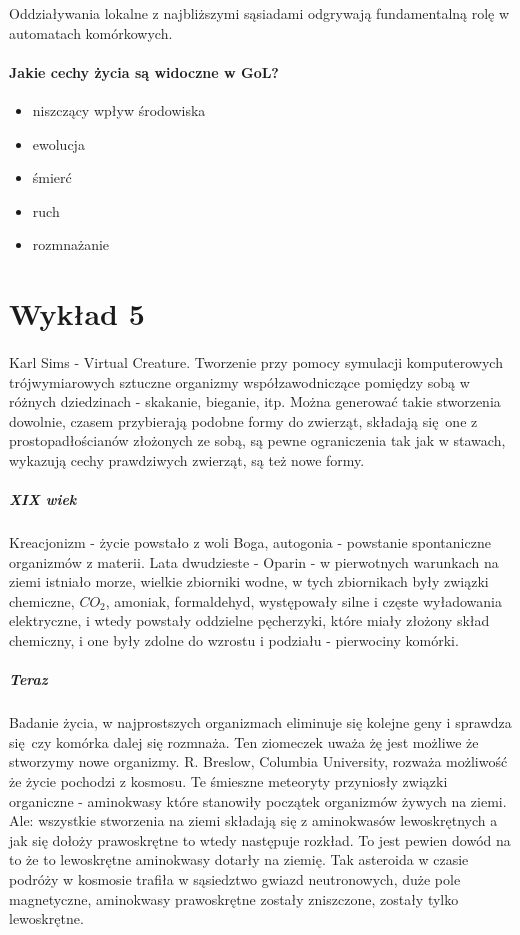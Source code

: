 \documentclass{article}
\begin{document}
		 Oddziaływania lokalne z najbliższymi sąsiadami odgrywają fundamentalną rolę w automatach komórkowych.
		\paragraph{Jakie cechy życia są widoczne w GoL?} 
		 \begin{itemize}
		 	\item niszczący wpływ środowiska
		 	\item ewolucja
		 	\item śmierć
		 	\item ruch
		 	\item rozmnażanie
		 \end{itemize}
	\section{Wykład 5}
		\paragraph{}Karl Sims - Virtual Creature. Tworzenie przy pomocy symulacji komputerowych trójwymiarowych sztuczne organizmy współzawodniczące pomiędzy sobą w różnych dziedzinach - skakanie, bieganie, itp. 
		Można generować takie stworzenia dowolnie, czasem przybierają podobne formy do zwierząt, składają się one z prostopadłościanów złożonych ze sobą, są pewne ograniczenia tak jak w stawach, wykazują cechy prawdziwych zwierząt, są też nowe formy. 
		
		\subparagraph{XIX wiek} Kreacjonizm - życie powstało z woli Boga, autogonia - powstanie spontaniczne organizmów z materii. Lata dwudzieste - Oparin - w pierwotnych warunkach na ziemi istniało morze, wielkie zbiorniki wodne, w tych zbiornikach były związki chemiczne, $CO_2$, amoniak, formaldehyd, występowały silne i częste wyładowania elektryczne, i wtedy powstały oddzielne pęcherzyki, które miały złożony skład chemiczny, i one były zdolne do wzrostu i podziału - pierwociny komórki. 
		\subparagraph{Teraz} Badanie życia, w najprostszych organizmach eliminuje się kolejne geny i sprawdza się czy komórka dalej się rozmnaża. Ten ziomeczek uważa żę jest możliwe że stworzymy nowe organizmy. R. Breslow, Columbia University, rozważa możliwość że życie pochodzi z kosmosu. Te śmieszne meteoryty przyniosły związki organiczne - aminokwasy które stanowiły początek organizmów żywych na ziemi. Ale: wszystkie stworzenia na ziemi składają się z aminokwasów lewoskrętnych a jak się dołoży prawoskrętne to wtedy następuje rozkład. To jest pewien dowód na to że to lewoskrętne aminokwasy dotarły na ziemię. Tak asteroida w czasie podróży w kosmosie trafiła w sąsiedztwo gwiazd neutronowych, duże pole magnetyczne, aminokwasy prawoskrętne zostały zniszczone, zostały tylko lewoskrętne. 
\end{document}
